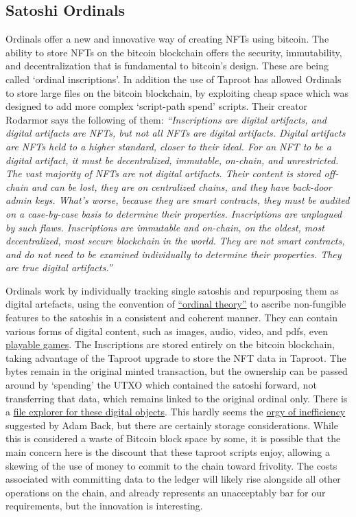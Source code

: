 \subsection{Satoshi Ordinals}
Ordinals offer a new and innovative way of creating NFTs using bitcoin. The ability to store NFTs on the bitcoin blockchain offers the security, immutability, and decentralization that is fundamental to bitcoin's design. These are being called `ordinal inscriptions'. In addition the use of Taproot has allowed Ordinals to store large files on the bitcoin blockchain, by exploiting cheap space which was designed to add more complex `script-path spend' scripts. Their creator Rodarmor says the following of them: \textit{``Inscriptions are digital artifacts, and digital artifacts are NFTs, but not all NFTs are digital artifacts. Digital artifacts are NFTs held to a higher standard, closer to their ideal. For an NFT to be a digital artifact, it must be decentralized, immutable, on-chain, and unrestricted. The vast majority of NFTs are not digital artifacts. Their content is stored off-chain and can be lost, they are on centralized chains, and they have back-door admin keys. What's worse, because they are smart contracts, they must be audited on a case-by-case basis to determine their properties. Inscriptions are unplagued by such flaws. Inscriptions are immutable and on-chain, on the oldest, most decentralized, most secure blockchain in the world. They are not smart contracts, and do not need to be examined individually to determine their properties. They are true digital artifacts.''}\par
Ordinals work by individually tracking single satoshis and repurposing them as digital artefacts, using the convention of \href{https://docs.ordinals.com/overview.html}{``ordinal theory''} to ascribe non-fungible features to the satoshis in a consistent and coherent manner. They can contain various forms of digital content, such as images, audio, video, and pdfs, even \href{https://ordinals.com/inscription/6edf80efbbae537b554340c31496439b57bef65357a57f21cbb547bc6287d7bfi0}{playable games}. The Inscriptions are stored entirely on the bitcoin blockchain, taking advantage of the Taproot upgrade to store the NFT data in Taproot. The bytes remain in the original minted transaction, but the ownership can be passed around by `spending' the UTXO which contained the  satoshi forward, not transferring that data, which remains linked to the original ordinal only. There is a \href{https://ordinals.com/}{file explorer for these digital objects}. This hardly seems the \href{https://twitter.com/adam3us/status/1619836529718996993?}{orgy of inefficiency} suggested by Adam Back, but there are certainly storage considerations.  While this is considered a waste of Bitcoin block space by some, it is possible that the main concern here is the discount that these taproot scripts enjoy, allowing a skewing of the use of money to commit to the chain toward frivolity. The costs associated with committing data to the ledger will likely rise alongside all other operations on the chain, and already represents an unacceptably bar for our requirements, but the innovation is interesting.\par

